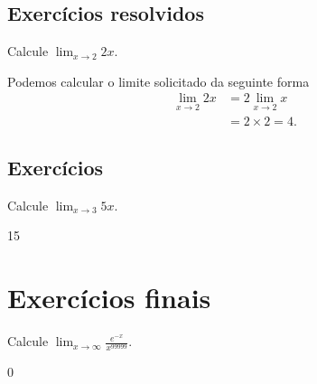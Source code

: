\subsection*{Exercícios resolvidos}

\construirExeresol

\begin{exeresol}
  Calcule $\lim_{x\to 2} 2x$.
\end{exeresol}
\begin{resol}
  Podemos calcular o limite solicitado da seguinte forma
  \begin{equation}
    \begin{split}
      \lim_{x\to 2} 2x &= 2\lim_{x\to 2} x\\
      &= 2\times 2 = 4.
    \end{split}
  \end{equation}
\end{resol}

\subsection*{Exercícios}

\construirExer

\begin{exer}
  Calcule $\lim_{x\to 3} 5x$.
\end{exer}
\begin{resp}
  15
\end{resp}

\section{Exercícios finais}

\construirExer

\begin{exer}
  Calcule $\displaystyle\lim_{x\to \infty} \frac{e^{-x}}{x^{99999}}$.
\end{exer}
\begin{resp}
  0
\end{resp}

